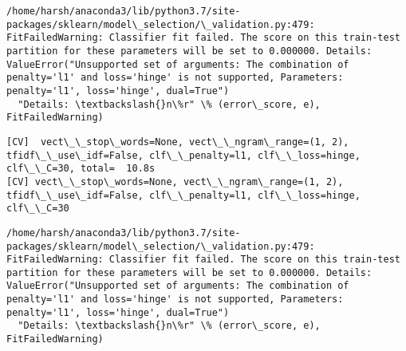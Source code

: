 \documentclass[11pt]{article}
\begin{document}
    \begin{Verbatim}[commandchars=\\\{\}]
/home/harsh/anaconda3/lib/python3.7/site-packages/sklearn/model\_selection/\_validation.py:479: FitFailedWarning: Classifier fit failed. The score on this train-test partition for these parameters will be set to 0.000000. Details: 
ValueError("Unsupported set of arguments: The combination of penalty='l1' and loss='hinge' is not supported, Parameters: penalty='l1', loss='hinge', dual=True")
  "Details: \textbackslash{}n\%r" \% (error\_score, e), FitFailedWarning)

    \end{Verbatim}

    \begin{Verbatim}[commandchars=\\\{\}]
[CV]  vect\_\_stop\_words=None, vect\_\_ngram\_range=(1, 2), tfidf\_\_use\_idf=False, clf\_\_penalty=l1, clf\_\_loss=hinge, clf\_\_C=30, total=  10.8s
[CV] vect\_\_stop\_words=None, vect\_\_ngram\_range=(1, 2), tfidf\_\_use\_idf=False, clf\_\_penalty=l1, clf\_\_loss=hinge, clf\_\_C=30 

    \end{Verbatim}

    \begin{Verbatim}[commandchars=\\\{\}]
/home/harsh/anaconda3/lib/python3.7/site-packages/sklearn/model\_selection/\_validation.py:479: FitFailedWarning: Classifier fit failed. The score on this train-test partition for these parameters will be set to 0.000000. Details: 
ValueError("Unsupported set of arguments: The combination of penalty='l1' and loss='hinge' is not supported, Parameters: penalty='l1', loss='hinge', dual=True")
  "Details: \textbackslash{}n\%r" \% (error\_score, e), FitFailedWarning)

    \end{Verbatim}
\end{document}
